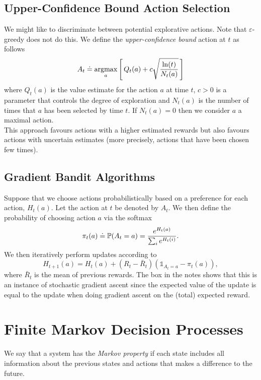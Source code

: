 \subsection{Upper-Confidence Bound Action Selection}
We might like to discriminate between potential explorative actions. Note that $\varepsilon$-greedy does not do this. We define the \emph{upper-confidence bound} action at $t$ as follows
\begin{equation}
    A_t \doteq \argmax_{a}\left[ \, Q_t(a)+ c \sqrt{\frac{\mathrm{ln}(t)}{N_t(a)}} \, \right]
\end{equation}
where $Q_t(a)$ is the value estimate for the action $a$ at time $t$, $c > 0$ is a parameter that controls the degree of exploration and $N_t(a)$ is the number of times that $a$ has been selected by time $t$. If $N_t(a) = 0$ then we consider $a$ a maximal action.\\

This approach favours actions with a higher estimated rewards but also favours actions with uncertain estimates (more precisely, actions that have been chosen few times).


\subsection{Gradient Bandit Algorithms}
Suppose that we choose actions probabilistically based on a preference for each action, $H_t(a)$. Let the action at $t$ be denoted by $A_t$. We then define the probability of choosing action $a$ via the softmax
\begin{equation}
    \pi_t(a) \doteq \P{}(A_t = a) = \frac{e^{H_t(a)}}{\sum_i e^{H_t(i)}}.
\end{equation}
We then iteratively perform updates according to 
\begin{equation}
    H_{t+1}(a) = H_t(a) + (R_t - \bar{R}_t)(\mathds{1}_{A_t = a} - \pi_t(a)),
\end{equation}
where $\bar{R}_t$ is the mean of previous rewards. The box in the notes shows that this is an instance of stochastic gradient ascent since the expected value of the update is equal to the update when doing gradient ascent on the (total) expected reward.

\clearpage
\section{Finite Markov Decision Processes}
We say that a system has the \emph{Markov property} if each state includes all information about the previous states and actions that makes a difference to the future.\\

